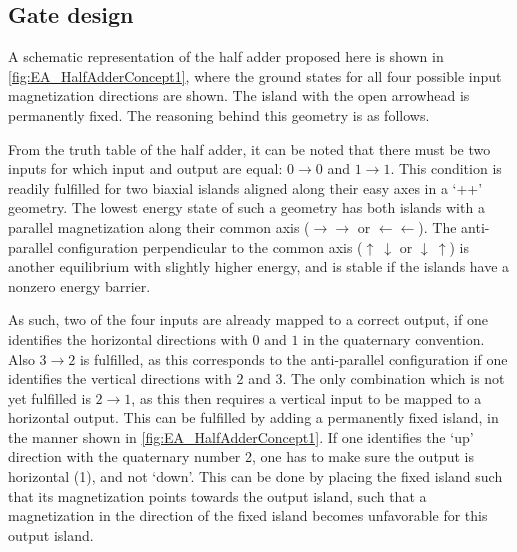 \documentclass[twocolumn]{phdsymp}
\begin{document}
\subsection{Gate design}
A schematic representation of the half adder proposed here is shown in \cref{fig:EA_HalfAdderConcept1}, where the ground states for all four possible input magnetization directions are shown. The island with the open arrowhead is permanently fixed. The reasoning behind this geometry is as follows. \par
From the truth table of the half adder, it can be noted that there must be two inputs for which input and output are equal: $0\rightarrow0$ and $1\rightarrow1$. This condition is readily fulfilled for two biaxial islands aligned along their easy axes in a `++' geometry. The lowest energy state of such a geometry has both islands with a parallel magnetization along their common axis ($\rightarrow \rightarrow$ or $\leftarrow \leftarrow$). The anti-parallel configuration perpendicular to the common axis ($\uparrow~\downarrow$ or $\downarrow~\uparrow$) is another equilibrium with slightly higher energy, and is stable if the islands have a nonzero energy barrier. \par
As such, two of the four inputs are already mapped to a correct output, if one identifies the horizontal directions with $0$ and $1$ in the quaternary convention. Also $3\rightarrow2$ is fulfilled, as this corresponds to the anti-parallel configuration if one identifies the vertical directions with $2$ and $3$. The only combination which is not yet fulfilled is $2\rightarrow1$, as this then requires a vertical input to be mapped to a horizontal output. This can be fulfilled by adding a permanently fixed island, in the manner shown in \cref{fig:EA_HalfAdderConcept1}. If one identifies the `up' direction with the quaternary number 2, one has to make sure the output is horizontal (1), and not `down'. This can be done by placing the fixed island such that its magnetization points towards the output island, such that a magnetization in the direction of the fixed island becomes unfavorable for this output island.
\end{document}
